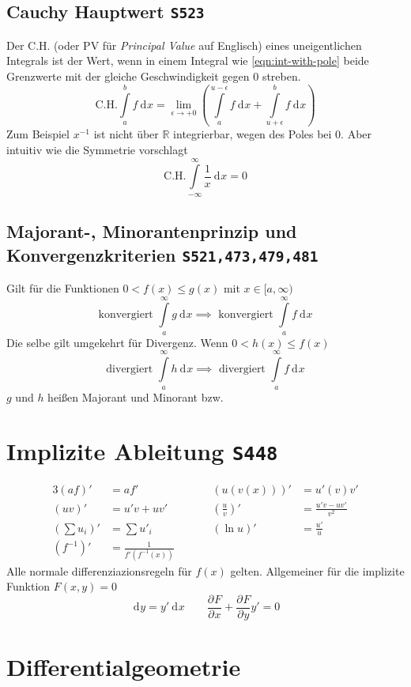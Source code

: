 \documentclass[a4paper, twocolumn]{article}
\numberwithin{equation}{subsection}
\newcommand{\dd}[2][]{\ensuremath{~\mathrm{d}^{#1} #2}}
\newcommand{\pderiv}[3][]{\ensuremath{\frac{\partial^{#1} #2}{\partial^{#1} #3}}}
\newcommand{\brpage}[1]{\textcolor{red!70!black}{\small\texttt{S#1}}}
\begin{document}
\subsection{Cauchy Hauptwert \brpage{523}}
Der C.H. (oder PV f\"ur \emph{Principal Value} auf Englisch) eines uneigentlichen Integrals ist der Wert, wenn in einem Integral wie \eqref{eqn:int-with-pole} beide Grenzwerte mit der gleiche Geschwindigkeit gegen 0 streben.
\[
    \text{C.H.} \int\limits_a^b f \dd{x} = 
    \lim_{\epsilon\to +0} \left( \int\limits_a^{u-\epsilon} f \dd{x}
    + \int\limits_{u+\epsilon}^b f \dd{x} \right)
\]
Zum Beispiel \(x^{-1}\) ist nicht \"uber \(\mathbb{R}\) integrierbar, wegen des Poles bei 0. Aber intuitiv wie die Symmetrie vorschlagt
\[
    \text{C.H.} \int\limits^\infty_{-\infty} \frac{1}{x} \dd{x} = 0
\]

\subsection{Majorant-, Minorantenprinzip und Konvergenzkriterien \brpage{521,473,479,481}}

Gilt f\"ur die Funktionen \(0 < f(x) \leq g(x)\) mit \(x \in [a,\infty)\)
\[
    \text{konvergiert } \int\limits_a^\infty g \dd{x} 
    \implies \text{ konvergiert } \int\limits_a^\infty f \dd{x}
\]
Die selbe gilt umgekehrt f\"ur Divergenz. Wenn \(0 < h(x) \leq f(x)\) 
\[
    \text{divergiert } \int\limits_a^\infty h \dd{x} 
    \implies \text{ divergiert } \int\limits_a^\infty f \dd{x}
\]
\(g\) und \(h\) hei{\ss}en Majorant und Minorant bzw.

\section{Implizite Ableitung \brpage{448}}
\begin{alignat*}{3}
  (af)' &= af' &\quad&& (u(v(x)))' &= u'(v)v' \\
  (uv)' &= u'v + uv' &\quad&& \left(\frac{u}{v}\right)' &= \frac{u'v-uv'}{v^2} \\
  \left(\sum u_i\right)' &= \sum u'_i &\quad&& (\ln u)' &= \frac{u'}{u} \\
  (f^{-1})' &= \frac{1}{f'(f^{-1}(x))}
\end{alignat*}
Alle normale differenziazionsregeln f\"ur \(f(x)\) gelten.
Allgemeiner f\"ur die implizite Funktion \(F(x,y) = 0\)
\[
 	\dd{y} = y'\dd{x}
	\qquad
	\pderiv{F}{x} + \pderiv{F}{y} y' = 0
\]


\section{Differentialgeometrie}
\end{document}
